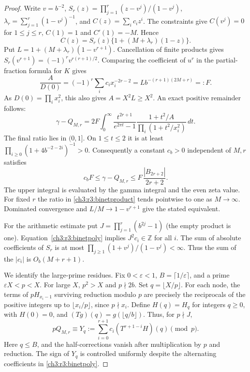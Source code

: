 \documentclass[11pt,a4paper,oneside,openany]{report}
\theoremstyle{remark}\newtheorem{remark}[theorem]{Remark}
\numberwithin{equation}{section}
\begin{document}
\begin{proof}
Write $v=b^{-2}$, $S_r(z)=\prod_{j=1}^r(z-v^j)/(1-v^j)$,
$\lambda_r=\sum_{j=1}^r (1-v^j)^{-1}$, and
$C(z)=\sum_i c_i z^i$. The constraints give $C(v^j)=0$ for
$1\le j\le r$, $C(1)=1$ and $C'(1)=-M$. Hence
\begin{equation}\label{ch3:r3:binetpoly}
 C(z)=S_r(z)\{1+(M+\lambda_r)(1-z)\}.
\end{equation}
Put $L=1+(M+\lambda_r)(1-v^{r+1})$. Cancellation of finite products
gives $S_r(v^{r+1})=(-1)^r v^{r(r+1)/2}$.
Comparing the coefficient of $u^r$ in the partial-fraction formula
for $K$ gives
\[
 \frac{A}{D(0)}
 =(-1)^r\sum_i c_i x_i^{-2r-2}
 =L b^{-(r+1)(2M+r)}=:F.
\]
As $D(0)=\prod_i x_i^2$, this also gives $A=X^2 L\ge X^2$.
An exact positive remainder follows:
\begin{equation}\label{ch3:r3:binetproduct}
 \gamma-Q_{M,r}
 =2F\int_0^\infty\frac{t^{2r+1}}{e^{2\pi t}-1}
 \frac{1+t^2/A}{\prod_i(1+t^2/x_i^2)}\,dt .
\end{equation}
The final ratio lies in $(0,1]$. On $1\le t\le2$ it is
at least $\prod_{i\ge0}(1+4b^{-2-2i})^{-1}>0$. Consequently
a constant $c_b>0$ independent of $M,r$ satisfies
\[
 c_b F\le \gamma-Q_{M,r}\le
 F\,\frac{|B_{2r+2}|}{2r+2}.
\]
The upper integral is evaluated by the gamma integral and the
even zeta value. For fixed $r$ the ratio in
\eqref{ch3:r3:binetproduct} tends pointwise to one as $M\to\infty$.
Dominated convergence and $L/M\to1-v^{r+1}$ give the stated equivalent.

For the arithmetic estimate put $J=\prod_{j=1}^r(b^{2j}-1)$ (the
empty product is one). Equation~\eqref{ch3:r3:binetpoly} implies
$J^2c_i\in\mathbb Z$ for all $i$. The sum of absolute coefficients
of $S_r$ is at most $\prod_{j\ge1}(1+v^j)/(1-v^j)<\infty$.
Thus the sum of the $|c_i|$ is $O_b(M+r+1)$.

We identify the large-prime residues. Fix $0<\varepsilon<1$,
$B=\lceil1/\varepsilon\rceil$, and a prime $\varepsilon X<p<X$.
For large $X$, $p^2>X$ and $p\nmid 2b$. Set $q=\lfloor X/p\rfloor$.
For each node, the terms of $pH_{x_i-1}$ surviving reduction modulo
$p$ are precisely the reciprocals of the positive integers up to
$\lfloor x_i/p\rfloor$, since $p\nmid x_i$. Define
$H(q)=H_q$ for integers $q\ge0$, with $H(0)=0$, and
$(Tg)(q)=g(\lfloor q/b\rfloor)$. Thus, for $p\nmid J$,
\[
 pQ_{M,r}\equiv Y_q:=\sum_{i=0}^{r+1}
        c_i(T^{r+1-i}H)(q)\pmod p.
\]
Here $q\le B$, and the half-corrections vanish after multiplication
by $p$ and reduction. The sign of $Y_q$ is controlled uniformly
despite the alternating coefficients in \eqref{ch3:r3:binetpoly}.


\end{proof}
\end{document}
